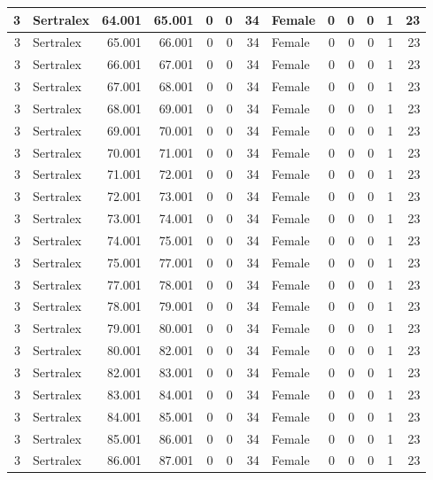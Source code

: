 \documentclass[
]{book}
\begin{document}
\begin{table}
\begin{tabular}[t]{r|l|r|r|r|r|r|l|r|r|r|r|r}
\hline
3 & Sertralex & 64.001 & 65.001 & 0 & 0 & 34 & Female & 0 & 0 & 0 & 1 & 23\\
\hline
3 & Sertralex & 65.001 & 66.001 & 0 & 0 & 34 & Female & 0 & 0 & 0 & 1 & 23\\
\hline
3 & Sertralex & 66.001 & 67.001 & 0 & 0 & 34 & Female & 0 & 0 & 0 & 1 & 23\\
\hline
3 & Sertralex & 67.001 & 68.001 & 0 & 0 & 34 & Female & 0 & 0 & 0 & 1 & 23\\
\hline
3 & Sertralex & 68.001 & 69.001 & 0 & 0 & 34 & Female & 0 & 0 & 0 & 1 & 23\\
\hline
3 & Sertralex & 69.001 & 70.001 & 0 & 0 & 34 & Female & 0 & 0 & 0 & 1 & 23\\
\hline
3 & Sertralex & 70.001 & 71.001 & 0 & 0 & 34 & Female & 0 & 0 & 0 & 1 & 23\\
\hline
3 & Sertralex & 71.001 & 72.001 & 0 & 0 & 34 & Female & 0 & 0 & 0 & 1 & 23\\
\hline
3 & Sertralex & 72.001 & 73.001 & 0 & 0 & 34 & Female & 0 & 0 & 0 & 1 & 23\\
\hline
3 & Sertralex & 73.001 & 74.001 & 0 & 0 & 34 & Female & 0 & 0 & 0 & 1 & 23\\
\hline
3 & Sertralex & 74.001 & 75.001 & 0 & 0 & 34 & Female & 0 & 0 & 0 & 1 & 23\\
\hline
3 & Sertralex & 75.001 & 77.001 & 0 & 0 & 34 & Female & 0 & 0 & 0 & 1 & 23\\
\hline
3 & Sertralex & 77.001 & 78.001 & 0 & 0 & 34 & Female & 0 & 0 & 0 & 1 & 23\\
\hline
3 & Sertralex & 78.001 & 79.001 & 0 & 0 & 34 & Female & 0 & 0 & 0 & 1 & 23\\
\hline
3 & Sertralex & 79.001 & 80.001 & 0 & 0 & 34 & Female & 0 & 0 & 0 & 1 & 23\\
\hline
3 & Sertralex & 80.001 & 82.001 & 0 & 0 & 34 & Female & 0 & 0 & 0 & 1 & 23\\
\hline
3 & Sertralex & 82.001 & 83.001 & 0 & 0 & 34 & Female & 0 & 0 & 0 & 1 & 23\\
\hline
3 & Sertralex & 83.001 & 84.001 & 0 & 0 & 34 & Female & 0 & 0 & 0 & 1 & 23\\
\hline
3 & Sertralex & 84.001 & 85.001 & 0 & 0 & 34 & Female & 0 & 0 & 0 & 1 & 23\\
\hline
3 & Sertralex & 85.001 & 86.001 & 0 & 0 & 34 & Female & 0 & 0 & 0 & 1 & 23\\
\hline
3 & Sertralex & 86.001 & 87.001 & 0 & 0 & 34 & Female & 0 & 0 & 0 & 1 & 23\\

\end{tabular}
\end{table}
\end{document}
